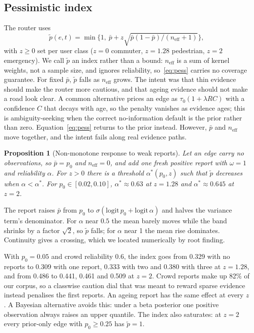 \documentclass[conference]{IEEEtran}
\newtheorem{proposition}{Proposition}
\begin{document}
\subsection{Pessimistic index}
The router uses
\begin{equation}
\tilde p(e,t) = \min\Big\{1,\ \bar p + z\sqrt{\bar p(1-\bar p)/(n_{\mathrm{eff}}+1)}\Big\}, \label{eq:pess}
\end{equation}
with $z\ge 0$ set per user class ($z=0$ commuter, $z=1.28$ pedestrian, $z=2$ emergency). We call $\tilde p$ an index rather than a bound: $n_{\mathrm{eff}}$ is a sum of kernel weights, not a sample size, and ignores reliability, so~\eqref{eq:pess} carries no coverage guarantee. For fixed $\bar p$, $\tilde p$ falls as $n_{\mathrm{eff}}$ grows. The intent was that thin evidence should make the router more cautious, and that ageing evidence should not make a road look clear. A common alternative prices an edge as $\tau_0(1+\lambda RC)$ with a confidence $C$ that decays with age, so the penalty vanishes as evidence ages; this is ambiguity-seeking when the correct no-information default is the prior rather than zero. Equation~\eqref{eq:pess} returns to the prior instead. However, $\bar p$ and $n_{\mathrm{eff}}$ move together, and the intent fails along real evidence paths.

\begin{proposition}[Non-monotone response to weak reports]\label{prop:dip}
Let an edge carry no observations, so $\bar p=p_0$ and $n_{\mathrm{eff}}=0$, and add one fresh positive report with $\omega=1$ and reliability $\alpha$. For $z>0$ there is a threshold $\alpha^*(p_0,z)$ such that $\tilde p$ decreases when $\alpha<\alpha^*$. For $p_0\in[0.02,0.10]$, $\alpha^*\approx0.63$ at $z=1.28$ and $\alpha^*\approx0.645$ at $z=2$.
\end{proposition}
\begin{IEEEproof}
The report raises $\bar p$ from $p_0$ to $\sigma(\mathrm{logit}\,p_0+\mathrm{logit}\,\alpha)$ and halves the variance term's denominator. For $\alpha$ near $0.5$ the mean barely moves while the band shrinks by a factor $\sqrt2$, so $\tilde p$ falls; for $\alpha$ near 1 the mean rise dominates. Continuity gives a crossing, which we located numerically by root finding.
\end{IEEEproof}
With $p_0=0.05$ and crowd reliability $0.6$, the index goes from 0.329 with no reports to 0.309 with one report, 0.333 with two and 0.380 with three at $z=1.28$, and from 0.486 to 0.441, 0.461 and 0.509 at $z=2$. Crowd reports make up 82\% of our corpus, so a classwise caution dial that was meant to reward sparse evidence instead penalises the first reports. An ageing report has the same effect at every $z$. A Bayesian alternative avoids this: under a beta posterior one positive observation always raises an upper quantile. The index also saturates: at $z=2$ every prior-only edge with $p_0\ge0.25$ has $\tilde p=1$.
\end{document}
